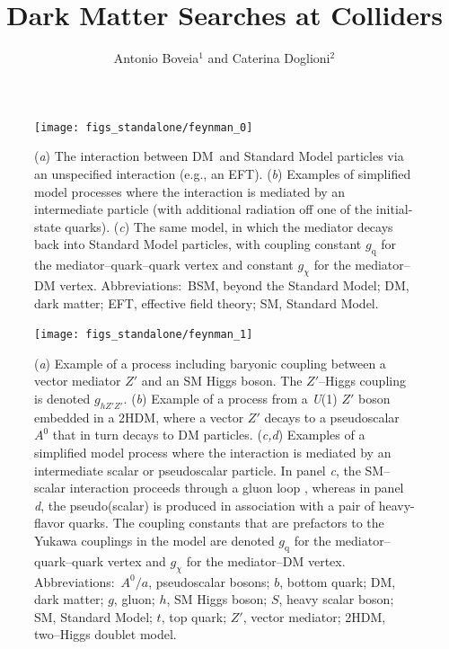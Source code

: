 \documentclass{ar-1col}
\newcommand{\chiDM}{\ensuremath{\chi}\xspace}
\newcommand{\gDM}{\ensuremath{g_{\chiDM}}\xspace}
\newcommand{\gdm}{\gDM}
\newcommand{\gq}{$g_{\mathrm{q}}$\xspace}
\newcommand{\ghZprimeZprime}{\ensuremath{g_{hZ'Z'}}\xspace}
\begin{document}

\title{Dark Matter Searches at Colliders}

\author{Antonio Boveia$^1$ and Caterina Doglioni$^2$
 }

\clearpage

\begin{figure}[!htpb]
\texttt{[image: figs\_standalone/feynman\_0]}
\caption{(\textit{a}) The interaction between DM\ and Standard Model particles via an unspecified interaction (e.g., an EFT).
(\textit{b}) Examples of simplified model processes where the interaction is mediated by an intermediate particle (with additional radiation off one of the initial-state quarks). 
(\textit{c}) The same model, in which  the mediator decays back into Standard Model particles, with coupling constant  \gq  for the mediator--quark--quark vertex and constant  \gdm for the mediator--DM vertex. 
Abbreviations:\ BSM, beyond the Standard Model; DM, dark matter; EFT, effective field theory; SM, Standard Model. \label{fig:feynman_0}}
\end{figure}

\clearpage

\begin{figure}[!htpb]
\texttt{[image: figs\_standalone/feynman\_1]}
\caption{
(\textit{a}) Example of a process including baryonic coupling between a vector mediator $Z'$ and an SM Higgs boson. The $Z'$--Higgs coupling is denoted \ghZprimeZprime. 
(\textit{b}) Example of a process from a \textit{U}(1) $Z'$ boson embedded in a 2HDM, where a vector $Z'$ decays to a pseudoscalar $A^0$ that in turn decays to DM particles. 
(\textit{c,d}) Examples of a simplified model process where the interaction is mediated by an intermediate scalar or pseudoscalar particle. In panel \textit{c}, the SM--scalar interaction proceeds through a gluon loop \cite{Haisch:2013ata}, whereas in panel \textit{d}, the pseudo(scalar) is produced in association with a pair of heavy-flavor quarks. The coupling constants that are prefactors to the Yukawa couplings in the model are denoted \gq for the mediator--quark--quark vertex and \gdm for the mediator--DM vertex. 
Abbreviations:\ $A^0/a$, pseudoscalar bosons; $b$, bottom quark; DM, dark matter;  $g$, gluon; $h$, SM Higgs boson; $S$, heavy scalar boson; SM, Standard Model; $t$, top quark; $Z'$, vector mediator; 2HDM, two--Higgs doublet model. }
\label{fig:feynman_1}
\end{figure}
\end{document}
